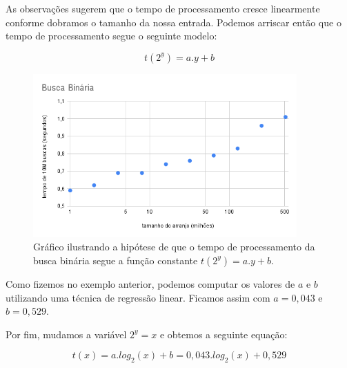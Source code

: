 As observações sugerem que o tempo de processamento cresce linearmente conforme dobramos o tamanho da nossa entrada.
Podemos arriscar então que o tempo de processamento segue o seguinte modelo:

\begin{displaymath}
  t(2^y) = a.y + b
\end{displaymath}

\begin{figure}[htp]
  \label{fig:hipotese3}
  \includegraphics[width=0.9\textwidth]{imagens/grafico4.png}
  \caption{Gráfico ilustrando a hipótese de que o tempo de processamento da busca binária segue a função constante $t(2^y) = a.y + b$.}
\end{figure}

Como fizemos no exemplo anterior, podemos computar os valores de $a$ e $b$ utilizando uma técnica de regressão linear.
Ficamos assim com $a = 0,043$ e $b = 0,529$.

Por fim, mudamos a variável $2^y = x$ e obtemos a seguinte equação:

\begin{displaymath}
  t(x) = a.log_2(x) + b = 0,043.log_2(x) + 0,529
\end{displaymath}


